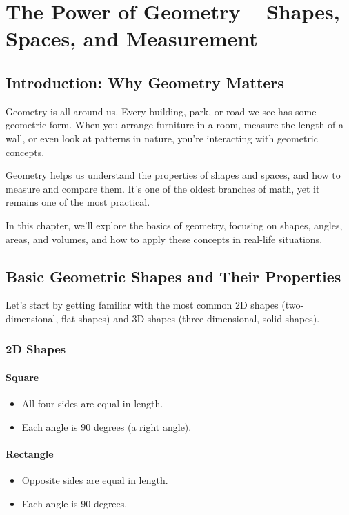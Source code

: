 \chapter{The Power of Geometry – Shapes, Spaces, and Measurement}

\section{Introduction: Why Geometry Matters}
Geometry is all around us. Every building, park, or road we see has some geometric form. When you arrange furniture in a room, measure the length of a wall, or even look at patterns in nature, you're interacting with geometric concepts.

Geometry helps us understand the properties of shapes and spaces, and how to measure and compare them. It’s one of the oldest branches of math, yet it remains one of the most practical.

In this chapter, we’ll explore the basics of geometry, focusing on shapes, angles, areas, and volumes, and how to apply these concepts in real-life situations.

\section{Basic Geometric Shapes and Their Properties}
Let’s start by getting familiar with the most common 2D shapes (two-dimensional, flat shapes) and 3D shapes (three-dimensional, solid shapes).

\subsection{2D Shapes}
\subsubsection{Square}
\begin{itemize}
    \item All four sides are equal in length.
    \item Each angle is 90 degrees (a right angle).
\end{itemize}

\subsubsection{Rectangle}
\begin{itemize}
    \item Opposite sides are equal in length.
    \item Each angle is 90 degrees.
\end{itemize}

